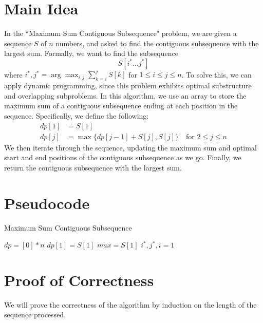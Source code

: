\documentclass{article}
\begin{document}
\section{Main Idea}

In the ``Maximum Sum Contiguous Subsequence" problem, we are given a sequence $S$ of $n$ numbers, and asked to find the contiguous subsequence with the largest sum.
Formally, we want to find the subsequence $$S[i^* \ldots j^*]$$ where $i^*, j^* = \arg\max_{i,j} \sum_{k=i}^{j} S[k]$ for $1 \leq i \leq j \leq n$.
To solve this, we can apply dynamic programming, since this problem exhibits optimal substructure and overlapping subproblems.
In this algorithm, we use an array to store the maximum sum of a contiguous subsequence ending at each position in the sequence.
Specifically, we define the following:
\begin{align*}
    dp[1] &= S[1] \\
    dp[j] &= \max\{dp[j-1] + S[j], S[j]\} \quad \text{for } 2 \leq j \leq n
\end{align*}
We then iterate through the sequence, updating the maximum sum and optimal start and end positions of the contiguous subsequence as we go.
Finally, we return the contiguous subsequence with the largest sum.

\section{Pseudocode}

\begin{algorithm}[H]
\caption{Maximum Sum Contiguous Subsequence}
$dp = [0] * n$\; 
$dp[1] = S[1]$\;
$max = S[1]$\;
$i^*, j^*, i = 1$\;
\;
\end{algorithm}

\section{Proof of Correctness}

We will prove the correctness of the algorithm by induction on the length of the sequence processed.
\end{document}
